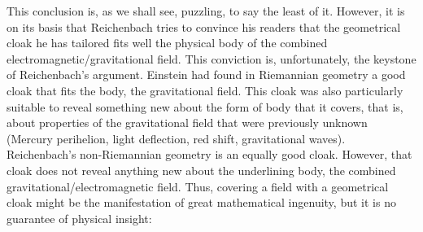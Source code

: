 \documentclass[final]{article}
\begin{document}
This conclusion is, as we shall see, puzzling, to say the least of it. However, it is on its basis that Reichenbach tries to convince his readers that the geometrical cloak he has tailored fits well the physical body of the combined electromagnetic/gravitational field. This conviction is, unfortunately, the keystone of Reichenbach's argument. Einstein had found in Riemannian geometry a good cloak that fits the body, the gravitational field. This cloak was also particularly suitable to reveal something new about the form of body that it covers, that is, about properties of the gravitational field that were previously unknown (Mercury perihelion, light deflection, red shift, gravitational waves\etc). Reichenbach's non-Riemannian geometry is an equally good cloak. However, that cloak does not reveal anything new about the underlining body, the combined gravitational/electromagnetic field. Thus, covering a field with a geometrical cloak might be the manifestation of great mathematical ingenuity, but it is no guarantee of physical insight:
\end{document}
